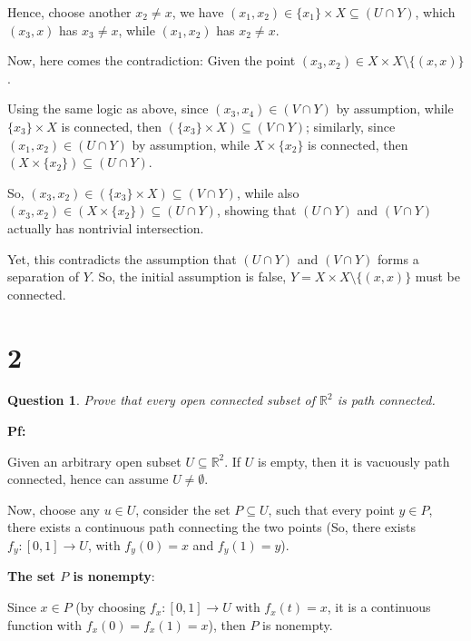\documentclass{article}
\newtheorem{question}{Question}
\begin{document}
Hence, choose another $x_2\neq x$, we have $(x_1,x_2)\in \{x_1\}\times X\subseteq (U\cap Y)$, which $(x_3,x)$ has $x_3\neq x$, while $(x_1,x_2)$ has $x_2\neq x$.

\hfil

Now, here comes the contradiction: Given the point $(x_3,x_2)\in X\times X\setminus\{(x,x)\}$.

Using the same logic as above, since $(x_3,x_4)\in (V\cap Y)$ by assumption, while $\{x_3\}\times X$ is connected, then $(\{x_3\}\times X)\subseteq (V\cap Y)$;
similarly, since $(x_1,x_2)\in (U\cap Y)$ by assumption, while $X\times \{x_2\}$ is connected, then $(X\times \{x_2\})\subseteq (U\cap Y)$.

So, $(x_3,x_2)\in (\{x_3\}\times X)\subseteq (V\cap Y)$, while also $(x_3,x_2)\in (X\times \{x_2\})\subseteq (U\cap Y)$, showing that $(U\cap Y)$ and $(V\cap Y)$ actually has nontrivial intersection.

Yet, this contradicts the assumption that $(U\cap Y)$ and $(V\cap Y)$ forms a separation of $Y$.
So, the initial assumption is false, $Y=X\times X\setminus\{(x,x)\}$ must be connected.

\hfil

\hfil

\section*{2}
\begin{myBox}[]{}
    \begin{question}
        Prove that every open connected subset of $\mathbb{R}^2$ is path connected.
    \end{question}
\end{myBox}

\textbf{Pf:}

Given an arbitrary open subset $U\subseteq \mathbb{R}^2$. If $U$ is empty, then it is vacuously path connected, hence can assume $U\neq \emptyset$.

Now, choose any $u\in U$, consider the set $P\subseteq U$, such that every point $y\in P$, there exists a continuous path connecting the two points (So, 
there exists $f_y:[0,1]\rightarrow U$, with $f_y(0)=x$ and $f_y(1)=y$).

\hfil

\textbf{The set $P$ is nonempty}: 

Since $x\in P$ (by choosing $f_x:[0,1]\rightarrow U$ with $f_x(t)=x$, it is a continuous function with $f_x(0)=f_x(1)=x$), then $P$ is nonempty.
\end{document}
